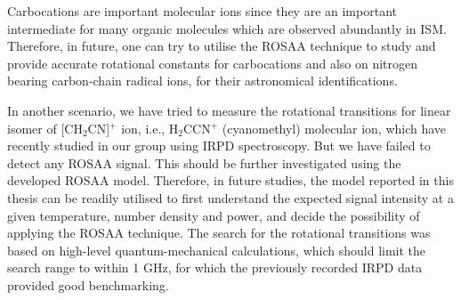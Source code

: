 Carbocations are important molecular ions since they are an important intermediate for many organic molecules which are observed abundantly in ISM. Therefore, in future, one can try to utilise the ROSAA technique to study and provide accurate rotational constants for carbocations and also on nitrogen bearing carbon-chain radical ions, for their astronomical identifications.


In another scenario, we have tried to measure the rotational transitions for linear isomer of [CH$_2$CN]$^+$ ion, i.e., H$_2$CCN$^+$ (cyanomethyl) molecular ion, which have recently studied in our group using IRPD spectroscopy. But we have failed to detect any ROSAA signal. This should be further investigated using the developed ROSAA model. Therefore, in future studies, the model reported in this thesis can be readily utilised to first understand the expected signal intensity at a given temperature, number density and power, and decide the possibility of applying the ROSAA technique. The search for the rotational transitions was based on high-level quantum-mechanical calculations, which should limit the search range to within 1 GHz, for which the previously recorded IRPD data provided good benchmarking.

